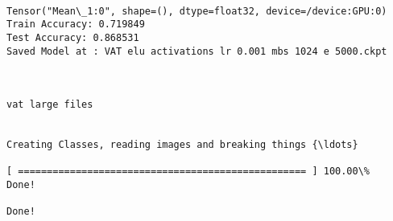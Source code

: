 \documentclass[11pt]{article}
\begin{document}
    \begin{center}
    \end{center}
    { \hspace*{\fill} \\}
    
    \begin{Verbatim}[commandchars=\\\{\}]
Tensor("Mean\_1:0", shape=(), dtype=float32, device=/device:GPU:0)
Train Accuracy: 0.719849
Test Accuracy: 0.868531
Saved Model at : VAT elu activations lr 0.001 mbs 1024 e 5000.ckpt



vat large files


Creating Classes, reading images and breaking things {\ldots}

[ ================================================== ] 100.00\%
Done!

Done!


\end{Verbatim}
\end{document}
